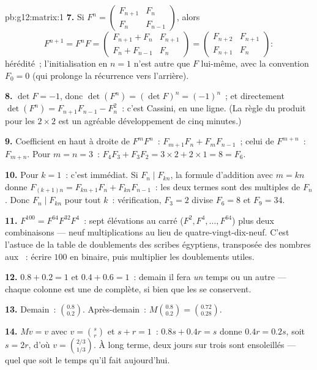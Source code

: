 \begin{solution}{pb:g12:matrix:1}
\textbf{7.} Si $F^n = \begin{pmatrix} F_{n+1} & F_n\\ F_n &
F_{n-1}\end{pmatrix}$, alors
\[
F^{n+1} = F^n F =
\begin{pmatrix} F_{n+1} + F_n & F_{n+1}\\
F_n + F_{n-1} & F_n \end{pmatrix}
= \begin{pmatrix} F_{n+2} & F_{n+1}\\ F_{n+1} & F_n
\end{pmatrix} :
\]
hérédité~; l'initialisation en $n = 1$ n'est autre que $F$
lui-même, avec la convention $F_0 = 0$ (qui prolonge la récurrence
vers l'arrière).

\textbf{8.} $\det F = -1$, donc
$\det(F^n) = (\det F)^n = (-1)^n$~; et directement
$\det(F^n) = F_{n+1}F_{n-1} - F_n^2$~: c'est Cassini, en une ligne.
(La règle du produit pour les  $2 \times 2$ est un
agréable développement de cinq minutes.)

\textbf{9.} Coefficient en haut à droite de $F^m F^n$~:
$F_{m+1}F_n + F_m F_{n-1}$~; celui de $F^{m+n}$~: $F_{m+n}$. Pour
$m = n = 3$~: $F_4 F_3 + F_3 F_2 = 3 \times 2 + 2 \times 1 = 8 =
F_6$.

\textbf{10.} Pour $k = 1$~: c'est immédiat. Si $F_n \mid F_{kn}$,
la formule d'addition avec $m = kn$ donne
$F_{(k+1)n} = F_{kn+1}F_n + F_{kn}F_{n-1}$~: les deux termes sont
des multiples de $F_n$. Donc $F_n \mid F_{kn}$ pour tout $k$~:
vérification, $F_3 = 2$ divise $F_6 = 8$ et $F_9 = 34$.

\textbf{11.} $F^{100} = F^{64} F^{32} F^4$~: sept élévations au
carré ($F^2, F^4, \dots, F^{64}$) plus deux combinaisons --- neuf
multiplications au lieu de quatre-vingt-dix-neuf. C'est l'astuce de
la table de doublements des scribes égyptiens, transposée des
nombres aux ~: écrire $100$ en binaire, puis multiplier les
doublements utiles.

\textbf{12.} $0.8 + 0.2 = 1$ et $0.4 + 0.6 = 1$~: demain il fera
\emph{un} temps ou un autre --- chaque colonne est une  de
 complète, si bien que les  se conservent.

\textbf{13.} Demain~: $\binom{0.8}{0.2}$. Après-demain~:
$M\binom{0.8}{0.2} = \binom{0.72}{0.28}$.

\textbf{14.} $Mv = v$ avec $v = \binom{s}{r}$ et $s + r = 1$~:
$0.8s + 0.4r = s$ donne $0.4r = 0.2s$, soit $s = 2r$, d'où
$v = \binom{2/3}{1/3}$. À long terme, deux jours sur trois sont
ensoleillés --- quel que soit le temps qu'il fait aujourd'hui.


\end{solution}
